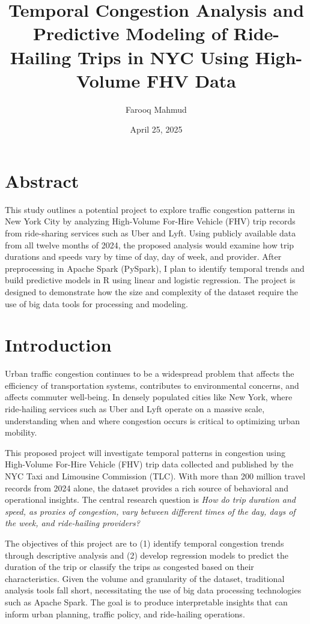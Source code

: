 \documentclass[12pt,letterpaper]{article}
\title{{\vspace{-2cm}}Temporal Congestion Analysis and Predictive Modeling of Ride-Hailing Trips in NYC Using High-Volume FHV Data}
\author{Farooq Mahmud}
\date{April 25, 2025}
\begin{document}
\maketitle

\section{Abstract}
This study outlines a potential project to explore traffic congestion patterns in New York City by analyzing High-Volume For-Hire Vehicle (FHV) trip records from ride-sharing services such as Uber and Lyft. Using publicly available data from all twelve months of 2024, the proposed analysis would examine how trip durations and speeds vary by time of day, day of week, and provider. After preprocessing in Apache Spark (PySpark), I plan to identify temporal trends and build predictive models in R using linear and logistic regression. The project is designed to demonstrate how the size and complexity of the dataset require the use of big data tools for processing and modeling.


\section{Introduction}
Urban traffic congestion continues to be a widespread problem that affects the efficiency of transportation systems, contributes to environmental concerns, and affects commuter well-being. In densely populated cities like New York, where ride-hailing services such as Uber and Lyft operate on a massive scale, understanding when and where congestion occurs is critical to optimizing urban mobility.

This proposed project will investigate temporal patterns in congestion using High-Volume For-Hire Vehicle (FHV) trip data collected and published by the NYC Taxi and Limousine Commission (TLC). With more than 200 million travel records from 2024 alone, the dataset provides a rich source of behavioral and operational insights. The central research question is \textit{How do trip duration and speed, as proxies of congestion, vary between different times of the day, days of the week, and ride-hailing providers?}

The objectives of this project are to (1) identify temporal congestion trends through descriptive analysis and (2) develop regression models to predict the duration of the trip or classify the trips as congested based on their characteristics. Given the volume and granularity of the dataset, traditional analysis tools fall short, necessitating the use of big data processing technologies such as Apache Spark. The goal is to produce interpretable insights that can inform urban planning, traffic policy, and ride-hailing operations.
\end{document}
